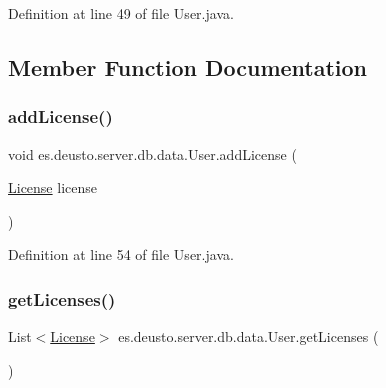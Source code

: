 Definition at line 49 of file User.\+java.



\subsection{Member Function Documentation}
\mbox{\label{classes_1_1deusto_1_1server_1_1db_1_1data_1_1_user_a1eefc1e49d4bf8046f3a7cdbca7f670d}} 
\subsubsection{\texorpdfstring{add\+License()}{addLicense()}}
{\footnotesize\ttfamily void es.\+deusto.\+server.\+db.\+data.\+User.\+add\+License (\begin{DoxyParamCaption}\item[{\hyperlink{classes_1_1deusto_1_1server_1_1db_1_1data_1_1_license}{License}}]{license }\end{DoxyParamCaption})}



Definition at line 54 of file User.\+java.

\mbox{\label{classes_1_1deusto_1_1server_1_1db_1_1data_1_1_user_adeddbb54df77d3779f739f27959588e1}} 
\subsubsection{\texorpdfstring{get\+Licenses()}{getLicenses()}}
{\footnotesize\ttfamily List$<$\hyperlink{classes_1_1deusto_1_1server_1_1db_1_1data_1_1_license}{License}$>$ es.\+deusto.\+server.\+db.\+data.\+User.\+get\+Licenses (\begin{DoxyParamCaption}{ }\end{DoxyParamCaption})}



